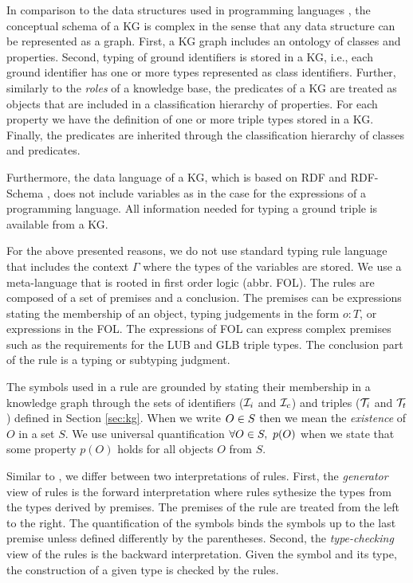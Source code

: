 \documentclass[runningheads]{llncs}
\newcommand{\I}{{\cal I}}
\newcommand{\T}{{\cal T}}
\begin{document}
In comparison to the data structures used in programming languages
\cite{Pierce2002,Hindley1997}, the conceptual schema of a KG is
complex in the sense that any data structure can be represented as a
graph. First, a KG graph includes an ontology of classes and
properties. Second, typing of ground identifiers is stored in a KG,
i.e., each ground identifier has one or more types represented as
class identifiers. Further, similarly to the \emph{roles}
\cite{Brachman1985} of a knowledge base, the predicates of a KG are
treated as objects that are included in a classification hierarchy of
properties. For each property we have the definition of one or more
triple types stored in a KG. Finally, the predicates are inherited
through the classification hierarchy of classes and predicates.

Furthermore, the data language of a KG, which is based on RDF and
RDF-Schema \cite{rdf,rdfschema}, does not include variables as in
the case for the expressions of a programming language. All
information needed for typing a ground triple is available from a KG.

For the above presented reasons, we do not use standard typing rule
language \cite{Pierce2002,Hindley1997} that includes the context
$\Gamma$ where the types of the variables are stored. We use a
meta-language that is rooted in first order logic (abbr. FOL). The
rules are composed of a set of premises and a conclusion. The premises
can be expressions stating the membership of an object, typing
judgements in the form $o:T$, or expressions in the FOL. The
expressions of FOL can express complex premises such as the
requirements for the LUB and GLB triple types. The conclusion part of
the rule is a typing or subtyping judgment.

The symbols used in a rule are grounded by stating their membership in
a knowledge graph through the sets of identifiers ($\I_i$ and $\I_c$)
and triples ($\T_i$ and $\T_t$) defined in Section \ref{sec:kg}. When
we write $O\in\/S$ then we mean the \emph{existence} of $O$ in a set
$S$. We use universal quantification $\forall\/O\in\/S,\ p(O)$ when we
state that some property $p(O)$ holds for all objects $O$ from $S$.

Similar to \cite{Dunfield2021}, we differ between two interpretations
of rules. First, the \emph{generator} view of rules is the forward
interpretation where rules sythesize the types from the types derived
by premises. The premises of the rule are treated from the left to the
right. The quantification of the symbols binds the symbols up to the
last premise unless defined differently by the parentheses. Second,
the \emph{type-checking} view of the rules is the backward
interpretation. Given the symbol and its type, the construction of a
given type is checked by the rules.
\end{document}
